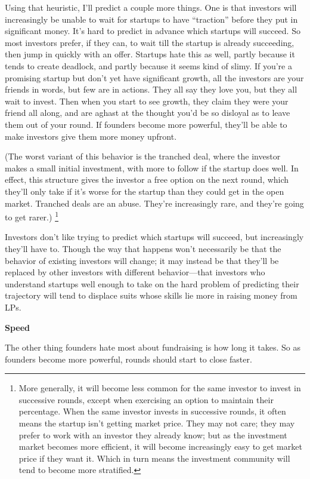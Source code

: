 \documentclass[12pt]{book}
\begin{document}
Using that heuristic, I'll predict a couple more things. One is that
investors will increasingly be unable to wait for startups to have
``traction'' before they put in significant money. It's hard to predict
in advance which startups will succeed. So most investors prefer, if
they can, to wait till the startup is already succeeding, then jump in
quickly with an offer. Startups hate this as well, partly because it
tends to create deadlock, and partly because it seems kind of slimy. If
you're a promising startup but don't yet have significant growth, all
the investors are your friends in words, but few are in actions. They
all say they love you, but they all wait to invest. Then when you start
to see growth, they claim they were your friend all along, and are
aghast at the thought you'd be so disloyal as to leave them out of your
round. If founders become more powerful, they'll be able to make
investors give them more money upfront.

(The worst variant of this behavior is the tranched deal, where the
investor makes a small initial investment, with more to follow if the
startup does well. In effect, this structure gives the investor a free
option on the next round, which they'll only take if it's worse for the
startup than they could get in the open market. Tranched deals are an
abuse. They're increasingly rare, and they're going to get rarer.)
\footnote{More generally, it will become less common for the same
investor to invest in successive rounds, except when exercising an
option to maintain their percentage. When the same investor invests in
successive rounds, it often means the startup isn't getting market
price. They may not care; they may prefer to work with an investor they
already know; but as the investment market becomes more efficient, it
will become increasingly easy to get market price if they want it. Which
in turn means the investment community will tend to become more
stratified.}

Investors don't like trying to predict which startups will succeed, but
increasingly they'll have to. Though the way that happens won't
necessarily be that the behavior of existing investors will change; it
may instead be that they'll be replaced by other investors with
different behavior---that investors who understand startups well enough
to take on the hard problem of predicting their trajectory will tend to
displace suits whose skills lie more in raising money from LPs.

\textbf{Speed}

The other thing founders hate most about fundraising is how long it
takes. So as founders become more powerful, rounds should start to close
faster.
\end{document}
